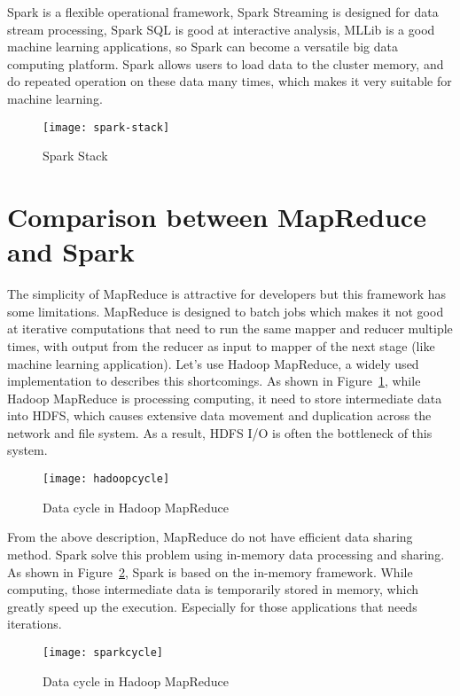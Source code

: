 Spark is a flexible operational framework, Spark Streaming is designed for data stream processing, Spark SQL is good at interactive analysis, MLLib is a good machine learning applications, so Spark can become a versatile big data computing platform\cite{apache_spark}. Spark allows users to load data to the cluster memory, and do repeated operation on these data many times, which makes it very suitable for machine learning.
\begin{figure}[h]
	\centering
	\texttt{[image: spark-stack]}
	\caption{Spark Stack}
\end{figure}

\section{Comparison between MapReduce and Spark}
The simplicity of MapReduce is attractive for developers but this framework has some limitations. MapReduce is designed to batch jobs which makes it not good at iterative computations that need to run the same mapper and reducer multiple times, with output from the reducer as input to mapper of the next stage (like machine learning application)\cite{shi2015clash}. Let's use Hadoop MapReduce, a widely used implementation to describes this shortcomings. As shown in Figure~\ref{fg:hadoop}, while Hadoop MapReduce is processing computing, it need to store intermediate data into HDFS, which causes extensive data movement and duplication across the network and file system. As a result, HDFS I/O is often the bottleneck of this system.

\begin{figure}[h]
	\centering
	\texttt{[image: hadoopcycle]}
	\caption{Data cycle in Hadoop MapReduce}
	\label{fg:hadoop}
\end{figure}

From the above description, MapReduce do not have efficient data sharing method. Spark solve this problem using in-memory data processing and sharing\cite{apache_spark}. As shown in Figure~\ref{fg:spark}, Spark is based on the in-memory framework. While computing, those intermediate data is temporarily stored in memory, which greatly speed up the execution. Especially for those applications that needs iterations.

\begin{figure}[h]
	\centering
	\texttt{[image: sparkcycle]}
	\caption{Data cycle in Hadoop MapReduce}
	\label{fg:spark}
\end{figure}


